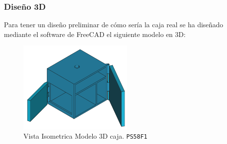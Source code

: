 \subsubsection{Diseño 3D}

Para tener un diseño preliminar de cómo sería la caja real se ha diseñado mediante el software de FreeCAD el siguiente modelo en 3D:

\begin{figure}[H]
    \centering
    \includegraphics[width=0.5\textwidth]{images/4-DesarrolloTeorico/4-1-caja/CAJA_3D_ISOMETRICA.png}
    \caption{Vista Isometrica Modelo 3D caja. \texttt{PS58F1}}
    \label{fig:DesarrolloTeorico/Caja/CAJA_3D_ISOMETRICA}
\end{figure}



